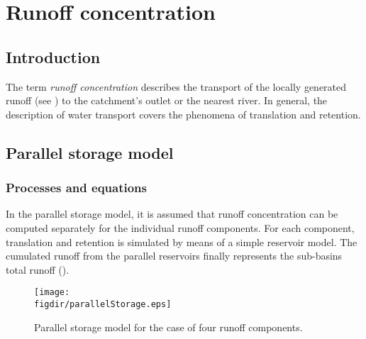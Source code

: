 \chapter{Runoff concentration} \label{chap:runConc}
\renewcommand{\tabdir}{chapters/part_processes/runoffConcentration/tab}
\renewcommand{\figdir}{chapters/part_processes/runoffConcentration/fig}

\section{Introduction} \label{sec:runConc_intro}

The term \emph{runoff concentration} describes the transport of the locally generated runoff (see ) to the catchment's outlet or the nearest river. In general, the description of water transport covers the phenomena of translation and retention.



\section{Parallel storage model} \label{sec:runConcParStor}


\subsection{Processes and equations} \label{sec:runConcParStor_processes}

In the parallel storage model, it is assumed that runoff concentration can be computed separately for the individual runoff components. For each component, translation and retention is simulated by means of a simple reservoir model. The cumulated runoff from the parallel reservoirs finally represents the sub-basins total runoff ().

\begin{figure}
  \texttt{[image: \\figdir/parallelStorage.eps]}
  \caption{Parallel storage model for the case of four runoff components. \label{fig:runConcParStor_scheme}}
\end{figure}

